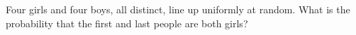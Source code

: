 Four girls and four boys, all distinct, line up uniformly at random. What is the probability that the first and last people are both girls?
